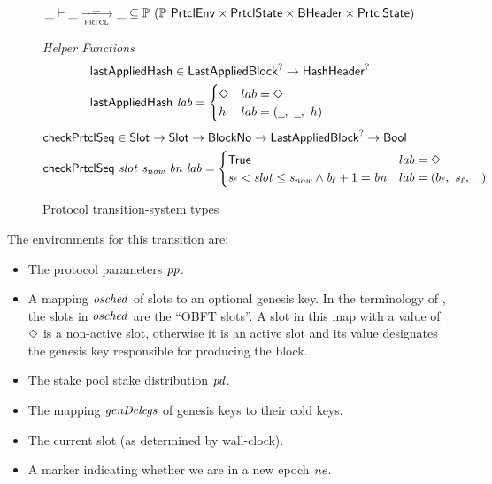 \begin{figure}
  \begin{equation*}
    \_ \vdash \var{\_} \trans{prtcl}{\_} \var{\_} \subseteq
    \powerset (\powerset{\PrtclEnv} \times \PrtclState \times \BHeader \times \PrtclState)
  \end{equation*}
  \caption{Protocol transition-system types}
  \label{fig:ts-types:prtcl}
  \emph{Helper Functions}
  \begin{align*}
      & \fun{lastAppliedHash} \in \LastAppliedBlock^? \to \HashHeader^? \\
      & \fun{lastAppliedHash}~\var{lab} =
        \begin{cases}
          \Nothing & lab = \Nothing \\
          h & lab = (\wcard,~\wcard,~h) \\
        \end{cases}
  \end{align*}
  \begin{align*}
      & \fun{checkPrtclSeq} \in \Slot \to \Slot \to \BlockNo \to \LastAppliedBlock^? \to \Bool \\
      & \fun{checkPrtclSeq}~\var{slot}~\var{s_{now}}~\var{bn}~\var{lab} =
        \begin{cases}
          \mathsf{True}
          &
          lab = \Nothing
          \\
          \var{s_\ell} < \var{slot} \leq \var{s_{now}} \land \var{b_\ell} + 1 = \var{bn}
          &
          lab = (b_\ell,~s_\ell,~\wcard) \\
        \end{cases}
  \end{align*}
\end{figure}

The environments for this transition are:
\begin{itemize}
  \item The protocol parameters $\mathit{pp}$.
  \item A mapping $\mathit{osched}$ of slots to an optional genesis key.
    In the terminology of \cite{delegation_design},
    the slots in $\mathit{osched}$ are the ``OBFT slots''.
    A slot in this map with a value of $\Diamond$ is a non-active slot,
    otherwise it is an active slot and its value designates the genesis key
    responsible for producing the block.
  \item The stake pool stake distribution $\mathit{pd}$.
  \item The mapping $\mathit{genDelegs}$ of genesis keys to their cold keys.
  \item The current slot (as determined by wall-clock).
  \item A marker indicating whether we are in a new epoch $\mathit{ne}$.
\end{itemize}

